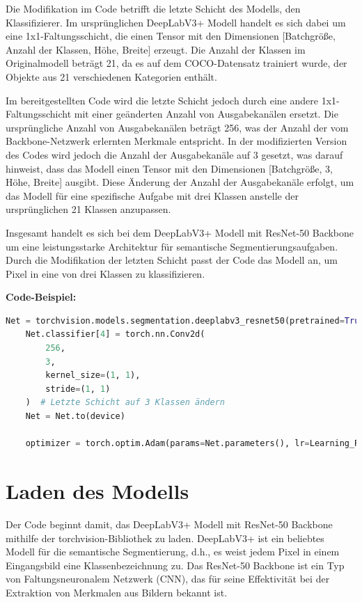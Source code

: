     Die Modifikation im Code betrifft die letzte Schicht des Modells, den Klassifizierer. Im ursprünglichen DeepLabV3+ Modell handelt es sich dabei um eine 1x1-Faltungsschicht, die einen Tensor mit den Dimensionen [Batchgröße, Anzahl der Klassen, Höhe, Breite] erzeugt. Die Anzahl der Klassen im Originalmodell beträgt 21, da es auf dem COCO-Datensatz trainiert wurde, der Objekte aus 21 verschiedenen Kategorien enthält.
    
    Im bereitgestellten Code wird die letzte Schicht jedoch durch eine andere 1x1-Faltungsschicht mit einer geänderten Anzahl von Ausgabekanälen ersetzt. Die ursprüngliche Anzahl von Ausgabekanälen beträgt 256, was der Anzahl der vom Backbone-Netzwerk erlernten Merkmale entspricht. In der modifizierten Version des Codes wird jedoch die Anzahl der Ausgabekanäle auf 3 gesetzt, was darauf hinweist, dass das Modell einen Tensor mit den Dimensionen [Batchgröße, 3, Höhe, Breite] ausgibt. Diese Änderung der Anzahl der Ausgabekanäle erfolgt, um das Modell für eine spezifische Aufgabe mit drei Klassen anstelle der ursprünglichen 21 Klassen anzupassen.
    
    Insgesamt handelt es sich bei dem DeepLabV3+ Modell mit ResNet-50 Backbone um eine leistungsstarke Architektur für semantische Segmentierungsaufgaben. Durch die Modifikation der letzten Schicht passt der Code das Modell an, um Pixel in eine von drei Klassen zu klassifizieren.
    
    \textbf{Code-Beispiel:}
    
    \begin{lstlisting}[language=Python]
    Net = torchvision.models.segmentation.deeplabv3_resnet50(pretrained=True)  # Modell laden
    Net.classifier[4] = torch.nn.Conv2d(
        256,
        3,
        kernel_size=(1, 1),
        stride=(1, 1)
    )  # Letzte Schicht auf 3 Klassen ändern
    Net = Net.to(device)
    
    optimizer = torch.optim.Adam(params=Net.parameters(), lr=Learning_Rate)  # Adam-Optimizer erstellen
    \end{lstlisting}
    
\section{Laden des Modells}
    Der Code beginnt damit, das DeepLabV3+ Modell mit ResNet-50 Backbone mithilfe der torchvision-Bibliothek zu laden. DeepLabV3+ ist ein beliebtes Modell für die semantische Segmentierung, d.h., es weist jedem Pixel in einem Eingangsbild eine Klassenbezeichnung zu. Das ResNet-50 Backbone ist ein Typ von Faltungsneuronalem Netzwerk (CNN), das für seine Effektivität bei der Extraktion von Merkmalen aus Bildern bekannt ist.
    
